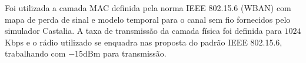 Foi utilizada a camada MAC definida pela norma IEEE 802.15.6 (WBAN) \cite{b5} com mapa de perda de sinal e modelo temporal para o canal sem fio fornecidos pelo simulador Castalia. A taxa de transmissão da camada física foi definida para $1024$ Kbps e o rádio utilizado se enquadra nas proposta do padrão IEEE 802.15.6, trabalhando com $-15$dBm para transmissão.


